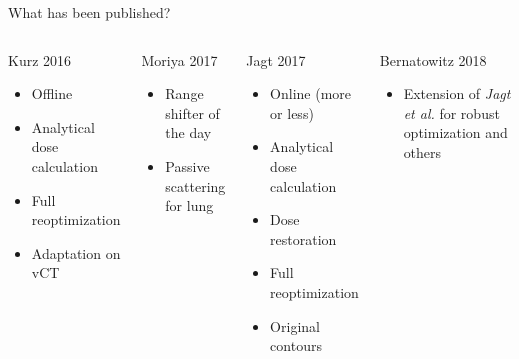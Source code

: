 \begin{frame}[c]{What has been published?}
	\begin{columns}[c]
		\begin{block}{Kurz 2016}
			\begin{itemize}
				\item Offline
				\item Analytical dose calculation
				\item Full reoptimization
				\item Adaptation on vCT
			\end{itemize}
		\end{block}
		\begin{block}{Moriya 2017}
			\begin{itemize}
				\item Range shifter of the day
				\item Passive scattering for lung
			\end{itemize}
		\end{block}
		\begin{block}{Jagt 2017}
			\begin{itemize}
				\item Online (more or less)
				\item Analytical dose calculation
				\item Dose restoration
				\item Full reoptimization
				\item Original contours
			\end{itemize}
		\end{block}
		\begin{block}{Bernatowitz 2018}
			\begin{itemize}
				\item Extension of \textit{Jagt et al.} for robust optimization and others
			\end{itemize}
		\end{block}
	\end{columns}
\end{frame}




